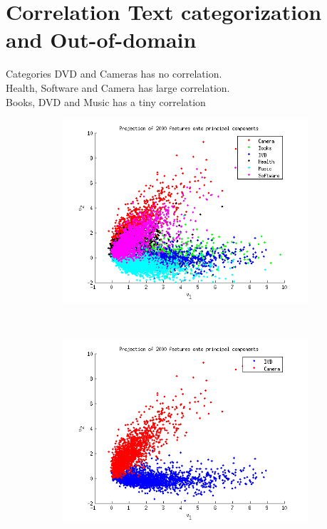 \section{Correlation Text categorization and Out-of-domain}
Categories DVD and Cameras has no correlation.\\
Health, Software and Camera has large correlation.\\
Books, DVD and Music has a tiny correlation
\begin{figure}[h!btcp]
        \centering
        \begin{subfigure}[b]{0.5\textwidth}
                \centering
                \includegraphics[width=\textwidth]{../Plottar/pca_all.png}
               \caption{}
        \end{subfigure}%
        ~ %
        \begin{subfigure}[b]{0.5\textwidth}
                \centering
                \includegraphics[width=\textwidth]{../Plottar/pca_nocorr.png} 

\end{subfigure}
\end{figure}
